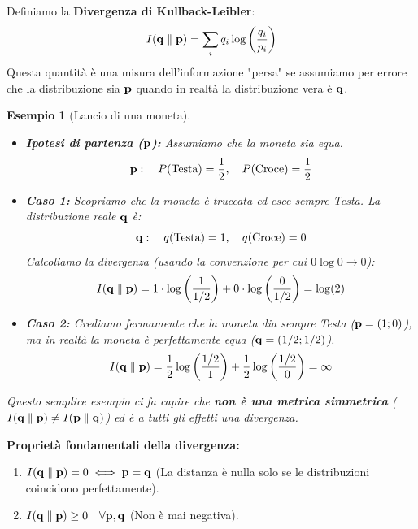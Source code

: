 \documentclass[openany]{book}
\newtheorem*{esempio}{Esempio}
\theoremstyle{definition}
\theoremstyle{remark}
\begin{document}
Definiamo la \textbf{Divergenza di Kullback-Leibler}:
\begin{equation}
    I(\vb{q} \parallel \vb{p}) = \sum_i q_i \log \left( \frac{q_i}{p_i} \right)
\end{equation}
Questa quantità è una misura dell'informazione "persa" se assumiamo per errore che la distribuzione sia $\vb{p}$ quando in realtà la distribuzione vera è $\vb{q}$.

\begin{esempio}[Lancio di una moneta]

    \begin{itemize}
    \item \textbf{Ipotesi di partenza ($\vb{p}$):} Assumiamo che la moneta sia equa.
    $$ \vb{p}: \quad P(\text{Testa}) = \frac{1}{2}, \quad P(\text{Croce}) = \frac{1}{2} $$
    
    \item \textbf{Caso 1:} Scopriamo che la moneta è truccata ed esce sempre Testa. La distribuzione reale $\vb{q}$ è:
    $$ \vb{q}: \quad q(\text{Testa}) = 1, \quad q(\text{Croce}) = 0 $$
    Calcoliamo la divergenza (usando la convenzione per cui $0 \log 0 \to 0$):
    $$ I(\vb{q} \parallel \vb{p}) = 1 \cdot \log\left(\frac{1}{1/2}\right) + 0 \cdot \log\left(\frac{0}{1/2}\right) = \log(2) $$
    
    \item \textbf{Caso 2:} Crediamo fermamente che la moneta dia sempre Testa ($\vb{p} = (1; 0)$), ma in realtà la moneta è perfettamente equa ($\vb{q} = (1/2; 1/2)$).
    $$ I(\vb{q} \parallel \vb{p}) = \frac{1}{2} \log\left(\frac{1/2}{1}\right) + \frac{1}{2} \log\left(\frac{1/2}{0}\right) = \infty $$
\end{itemize}
Questo semplice esempio ci fa capire che \textbf{non è una metrica simmetrica} ($I(\vb{q} \parallel \vb{p}) \neq I(\vb{p} \parallel \vb{q})$) ed è a tutti gli effetti una divergenza.
\end{esempio}

\textbf{Proprietà fondamentali della divergenza:}
\begin{enumerate}
    \item $I(\vb{q} \parallel \vb{p}) = 0 \iff \vb{p} = \vb{q}$ \quad (La distanza è nulla solo se le distribuzioni coincidono perfettamente).
    \item $I(\vb{q} \parallel \vb{p}) \ge 0 \quad \forall \vb{p}, \vb{q}$ \quad (Non è mai negativa).
\end{enumerate}
\end{document}
